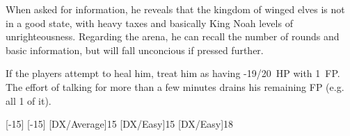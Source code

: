 \documentclass[twocolumn]{memoir}
\begin{document}
When asked for information, he reveals that the kingdom of winged elves is not in a good state, with heavy taxes and basically King Noah levels of unrighteousness. Regarding the arena, he can recall the number of rounds and basic information, but will fall unconcious if pressed further.

If the players attempt to heal him, treat him as having -19/20~HP with 1~FP. The effort of talking for more than a few minutes drains his remaining FP (e.g. all 1 of it).

\begin{character}
  [-15]
  [-15]
  [DX/Average]{15}
  [DX/Easy]{15}
  [DX/Easy]{18}
\end{character}
\end{document}
